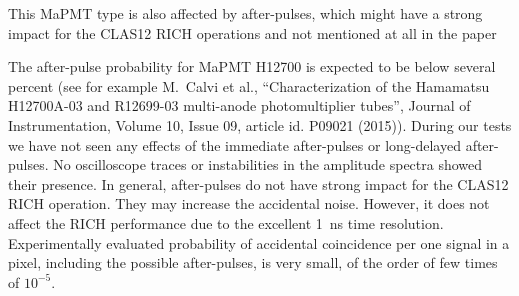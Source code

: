 \documentclass[11pt]{report}
\begin{document}
\begin{tcolorbox}[enlarge top by=2em,colbacktitle=red!60!white,colframe=black!80!white,left=0pt,right=0pt,top=0pt,bottom=0pt,boxrule=0.3pt,title=\bfseries2.04]
This MaPMT type is also affected by after-pulses, which might have a strong impact for the CLAS12 RICH operations and not mentioned at all in the paper
\end{tcolorbox}


The after-pulse probability for MaPMT H12700 is expected to be below several percent (see for example M.~Calvi et al.,   ``Characterization of the Hamamatsu H12700A-03 and R12699-03 multi-anode photomultiplier tubes'', Journal of Instrumentation, Volume 10, Issue 09, article id. P09021 (2015)). 
During our tests we have not seen any effects of the immediate after-pulses or long-delayed after-pulses. 
No oscilloscope traces or  instabilities in the amplitude spectra showed their presence.
In general, after-pulses do not have strong impact for the CLAS12 RICH operation. They may increase the accidental noise. However, it does not affect the RICH performance due to the excellent 1~ns time resolution. Experimentally evaluated probability of accidental coincidence per one signal in a pixel, including the possible after-pulses, is very small, of the order of few times of $10^{-5}$.



\end{document}
